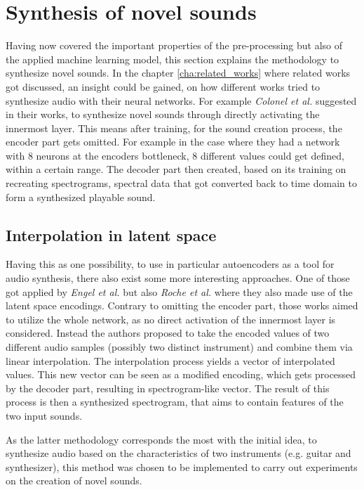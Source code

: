 \section{Synthesis of novel sounds}
\label{sec:app_interpolation}
Having now covered the important properties of the pre-processing but also of the applied machine learning model, this section explains the methodology to synthesize novel sounds. In the chapter \ref{cha:related_works} where related works got discussed, an insight could be gained, on how different works tried to synthesize audio with their neural networks. For example \textit{Colonel et al.}\cite{colonel2017improving, colonel2018autoencoding, Colonel2020} suggested in their works, to synthesize novel sounds through directly activating the innermost layer. This means after training, for the sound creation process, the encoder part gets omitted. For example in the case where they had a network with 8 neurons at the encoders bottleneck, 8 different values could get defined, within a certain range. The decoder part then created, based on its training on recreating spectrograms, spectral data that got converted back to time domain to form a synthesized playable sound. 

\subsection{Interpolation in latent space}
Having this as one possibility, to use in particular autoencoders as a tool for audio synthesis, there also exist some more interesting approaches. One of those got applied by \textit{Engel et al.} \cite{Engel2017} but also \textit{Roche et al.} \cite{roche2019autoencoders} where they also made use of the latent space encodings. Contrary to omitting the encoder part, those works aimed to utilize the whole network, as no direct activation of the innermost layer is considered. Instead the authors proposed to take the encoded values of two different audio samples (possibly two distinct instrument) and combine them via linear interpolation. The interpolation process yields a vector of interpolated values. This new vector can be seen as a modified encoding, which gets processed by the decoder part, resulting in spectrogram-like vector. The result of this process is then a synthesized spectrogram, that aims to contain features of the two input sounds.

As the latter methodology corresponds the most with the initial idea, to synthesize audio based on the characteristics of two instruments (e.g. guitar and synthesizer), this method was chosen to be implemented to carry out experiments on the creation of novel sounds.

